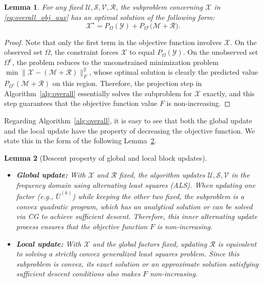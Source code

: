 \documentclass[a4paper,12pt]{article}
\numberwithin{equation}{section}
\numberwithin{algorithm}{section}
\newtheorem{lemma}{Lemma}[section]
\theoremstyle{remark}
\theoremstyle{definition}
\begin{document}
\begin{lemma}
	For any fixed $\mathcal{U},\mathcal{S},\mathcal{V},\mathcal{R}$, the subproblem concerning $\mathcal{X}$ in \eqref{eq:overall_obj_aux} has an optimal solution of the following form:
	\begin{equation}
		\mathcal{X}^{\star}=P_{\Omega}(\mathcal{Y})+P_{\Omega^{c}}\big(\mathcal{M}+\mathcal{R}\big).
		\label{eq:x_opt_proj}
	\end{equation}
\end{lemma}
\begin{proof}
	Note that only the first term in the objective function involves $\mathcal{X}$. On the observed set $\Omega$, the constraint forces $\mathcal{X}$ to equal $P_{\Omega}(\mathcal{Y})$. On the unobserved set $\Omega^c$, the problem reduces to the unconstrained minimization problem $\min \|\mathcal{X}-(\mathcal{M}+\mathcal{R})\|_F^2$, whose optimal solution is clearly the predicted value $P_{\Omega^c}(\mathcal{M}+\mathcal{R})$ on this region. Therefore, the projection step in Algorithm~\ref{alg:overall} essentially solves the subproblem for $\mathcal{X}$ exactly, and this step guarantees that the objective function value $F$ is non-increasing.
\end{proof}
Regarding Algorithm~\ref{alg:overall}, it is easy to see that both the global update and the local update have the property of decreasing the objective function. We state this in the form of the following Lemma~\ref{con_lem}.
\begin{lemma}[Descent property of global and local block updates]\label{con_lem}\hfill	
	\begin{itemize}
		\item \textbf{Global update:} With $\mathcal{X}$ and $\mathcal{R}$ fixed, the algorithm updates $\mathcal{U},\mathcal{S},\mathcal{V}$ in the frequency domain using alternating least squares (ALS). When updating one factor (e.g., $\bar{U}^{(k)}$) while keeping the other two fixed, the subproblem is a convex quadratic program, which has an analytical solution or can be solved via CG to achieve sufficient descent. Therefore, this inner alternating update process ensures that the objective function $F$ is non-increasing.
		\item \textbf{Local update:} With $\mathcal{X}$ and the global factors fixed, updating $\mathcal{R}$ is equivalent to solving a strictly convex generalized least squares problem. Since this subproblem is convex, its exact solution or an approximate solution satisfying sufficient descent conditions also makes $F$ non-increasing.
	\end{itemize}
\end{lemma}
\end{document}
